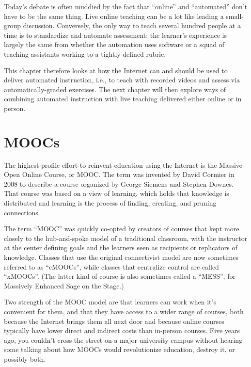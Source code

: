 Today's debate is often muddied by the fact that ``online'' and
``automated'' don't have to be the same thing.  Live online teaching
can be a lot like leading a small-group discussion.  Conversely, the
only way to teach several hundred people at a time is to standardize
and automate assessment; the learner's experience is largely the same
from whether the automation uses software or a squad of teaching
assistants working to a tightly-defined rubric.

This chapter therefore looks at how the Internet can and should be
used to deliver automated instruction, i.e., to teach with recorded
videos and assess via automatically-graded exercises.  The next
chapter will then explore ways of combining automated instruction with
live teaching delivered either online or in person.

\section{MOOCs}\label{s:online-moocs}

The highest-profile effort to reinvent education using the Internet is
the Massive Open Online Course, or MOOC.  The term was invented by
David Cormier in 2008 to describe a course organized by George Siemens
and Stephen Downes.  That course was based on a
 view of learning, which holds
that knowledge is distributed and learning is the process of finding,
creating, and pruning connections.

The term ``MOOC'' was quickly co-opted by creators of courses that
kept more closely to the hub-and-spoke model of a traditional
classroom, with the instructor at the center defining goals and the
learners seen as recipients or replicators of knowledge.  Classes that
use the original connectivist model are now sometimes referred to as
``cMOOCs'', while classes that centralize control are called
``xMOOCs''.  (The latter kind of course is also sometimes called a
``MESS'', for Massively Enhanced Sage on the Stage.)

Two strength of the MOOC model are that learners can work when it's
convenient for them, and that they have access to a wider range of
courses, both because the Internet brings them all next door and
because online courses typically have lower direct and indirect costs
than in-person courses.  Five years ago, you couldn't cross the street
on a major university campus without hearing some talking about how
MOOCs would revolutionize education, destroy it, or possibly both.

